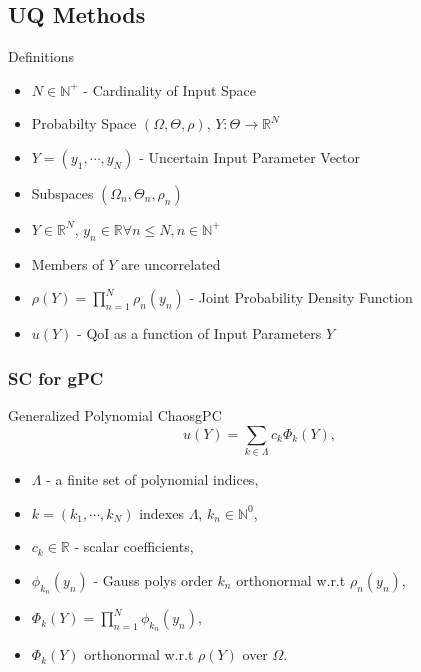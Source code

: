 \documentclass{beamer}
\begin{document}
\subsection{UQ Methods}
\begin{frame}{Definitions}{}\vspace{-20pt}
  \begin{itemize}
    \item $N\in\mathbb{N^+}$ - Cardinality of Input Space
    \item Probabilty Space $(\Omega,\Theta,\rho)$, $Y:\Theta\to\mathbb{R}^N$
    \item $Y=(y_1,\cdots,y_N)$ - Uncertain Input Parameter Vector
    \item Subspaces $(\Omega_n,\Theta_n,\rho_n)$
    \item $Y\in\mathbb{R}^N$, $y_n\in\mathbb{R}\forall n\leq N,n\in\mathbb{N^+}$
    \item Members of $Y$ are uncorrelated
    \item $\rho(Y)=\prod_{n=1}^N \rho_n(y_n)$ - Joint Probability Density Function
    \vspace{10pt}
    \item $u(Y)$ - QoI as a function of Input Parameters $Y$
  \end{itemize}
\end{frame}


\subsubsection{SC for gPC}
\begin{frame}{Generalized Polynomial Chaos}{gPC}\vspace{-20pt}
  \begin{equation*}
    u(Y) = \sum_{k\in\Lambda} c_k \Phi_k(Y),
  \end{equation*}\vspace{-10pt}
  \begin{itemize}
    \item $\Lambda$ - a finite set of polynomial indices,
    \item $k=(k_1,\cdots,k_N)$ indexes $\Lambda$, $k_n\in\mathbb{N}^0$,
    \item $c_k\in\mathbb{R}$ - scalar coefficients,
    \item $\phi_{k_n}(y_n)$ - Gauss polys order $k_n$ orthonormal w.r.t $\rho_n(y_n)$,
    \item $\Phi_k(Y)=\prod_{n=1}^N\phi_{k_n}(y_n)$,
    \item $\Phi_k(Y)$ orthonormal w.r.t $\rho(Y)$ over $\Omega$.
  \end{itemize}
\end{frame}
\end{document}
